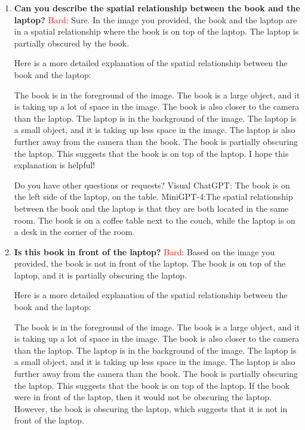 \begin{enumerate}
    \item \textbf{Can you describe the spatial relationship between the book and the laptop?}
    \subitem \textcolor{Red}{Bard}:
    Sure. In the image you provided, the book and the laptop are in a spatial relationship where the book is on top of the laptop. The laptop is partially obscured by the book.
    
    Here is a more detailed explanation of the spatial relationship between the book and the laptop:
    
    The book is in the foreground of the image. The book is a large object, and it is taking up a lot of space in the image. The book is also closer to the camera than the laptop.
    The laptop is in the background of the image. The laptop is a small object, and it is taking up less space in the image. The laptop is also further away from the camera than the book.
    The book is partially obscuring the laptop. This suggests that the book is on top of the laptop.
    I hope this explanation is helpful!
    
    Do you have other questions or requests?
    \subitem Visual ChatGPT: The book is on the left side of the laptop, on the table.
    \subitem MiniGPT-4:The spatial relationship between the book and the laptop is that they are both located in the same room. The book is on a coffee table next to the couch, while the laptop is on a desk in the corner of the room. 
    \item \textbf{Is this book in front of the laptop?}
    \subitem \textcolor{Red}{Bard}: 
    Based on the image you provided, the book is not in front of the laptop. The book is on top of the laptop, and it is partially obscuring the laptop.
    
    Here is a more detailed explanation of the spatial relationship between the book and the laptop:
    
    The book is in the foreground of the image. The book is a large object, and it is taking up a lot of space in the image. The book is also closer to the camera than the laptop.
    The laptop is in the background of the image. The laptop is a small object, and it is taking up less space in the image. The laptop is also further away from the camera than the book.
    The book is partially obscuring the laptop. This suggests that the book is on top of the laptop.
    If the book were in front of the laptop, then it would not be obscuring the laptop. However, the book is obscuring the laptop, which suggests that it is not in front of the laptop.
    

\end{enumerate}
